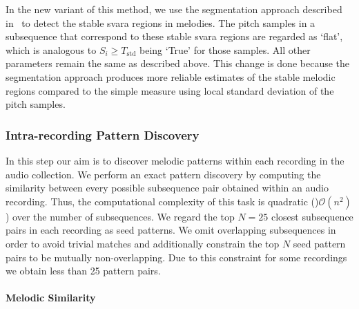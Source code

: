 In the new variant of this method, we use the segmentation approach described in~ to detect the stable \gls{svara} regions in melodies. The pitch samples in a subsequence that correspond to these stable \gls{svara} regions are regarded as `flat', which is analogous to $S_i\geq T_{\text{std}}$ being `True' for those samples. All other parameters remain the same as described above. This change is done because the segmentation approach produces more reliable estimates of the stable melodic regions compared to the simple measure using local standard deviation of the pitch samples. 


\subsubsection{Intra-recording Pattern Discovery}
\label{sec:intraRecordingPatternDiscovery}

In this step our aim is to discover melodic patterns within each recording in the audio collection. We perform an exact pattern discovery by computing the similarity between every possible subsequence pair obtained within an audio recording. Thus, the computational complexity of this task is quadratic ()$\mathcal{O}(n^2)$) over the number of subsequences. We regard the top $N=25$ closest subsequence pairs in each recording as seed patterns. We omit overlapping subsequences in order to avoid trivial matches and additionally constrain the top $N$ seed pattern pairs to be mutually non-overlapping. Due to this constraint for some recordings we obtain less than 25 pattern pairs. 


\paragraph{Melodic Similarity} 


